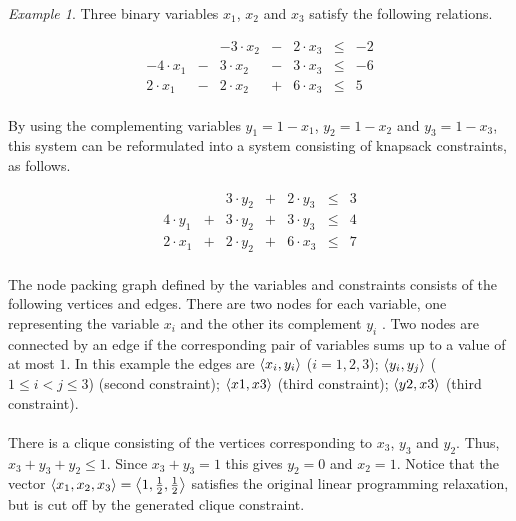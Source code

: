 \documentclass[titlepage]{book}
\theoremstyle{plain}
\theoremstyle{definition}
\theoremstyle{remark}
\newtheorem{example}{Example}
\begin{document}
\begin{example}
Three binary variables $x_1$, $x_2$ and $x_3$ satisfy the following relations.

\begin{equation}
\begin{array}{rcrcrcr}
&&-3\cdot x_2&-&2\cdot x_3&\leq&-2\\
-4\cdot x_1&-&3\cdot x_2&-&3\cdot x_3&\leq&-6\\
2\cdot x_1&-&2\cdot x_2&+&6\cdot x_3&\leq&5
\end{array}
\end{equation}

\paragraph{}
By using the complementing variables $y_1=1-x_1$, $y_2=1-x_2$ and $y_3=1-x_3$, this system can be reformulated into a system consisting of knapsack constraints, as follows.

\begin{equation}
\begin{array}{rcrcrcr}
&&3\cdot y_2&+&2\cdot y_3&\leq&3\\
4\cdot y_1&+&3\cdot y_2&+&3\cdot y_3&\leq&4\\
2\cdot x_1&+&2\cdot y_2&+&6\cdot x_3&\leq&7
\end{array}
\end{equation}

\paragraph{}
The node packing graph defined by the variables and constraints consists of the following vertices and edges. There are two nodes for each variable, one representing the variable $x_i$ and the other its complement $y_i$ . Two nodes are connected by an edge if the corresponding pair of variables sums up to a value of at most $1$. In this example the edges are $\left\langle x_i,y_i \right\rangle$ ($i=1,2,3$); $\left\langle y_i,y_j \right\rangle$ ($1\leq i < j \leq 3$) (second constraint); $\left\langle x1,x3 \right\rangle$ (third constraint); $\left\langle y2,x3 \right\rangle$ (third constraint).


\paragraph{}
There is a clique consisting of the vertices corresponding to $x_3$, $y_3$ and $y_2$. Thus, $x_3+y_3+y_2\leq 1$. Since $x_3+y_3=1$ this gives $y_2=0$ and $x_2=1$. Notice that the vector $\left\langle x_1,x_2,x_3 \right\rangle=\left\langle 1,\frac{1}{2},\frac{1}{2} \right\rangle$ satisfies the original linear programming relaxation, but is cut off by the generated clique constraint.
\end{example}
\end{document}
